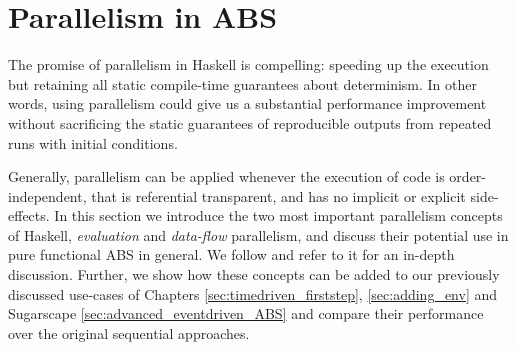 \chapter{Parallelism in ABS}
\label{ch:parallelism_ABS}

The promise of parallelism in Haskell is compelling: speeding up the execution but retaining all static compile-time guarantees about determinism. In other words, using parallelism could give us a substantial performance improvement without sacrificing the static guarantees of reproducible outputs from repeated runs with initial conditions.

Generally, parallelism can be applied whenever the execution of code is order-independent, that is referential transparent, and has no implicit or explicit side-effects. In this section we introduce the two most important parallelism concepts of Haskell, \textit{evaluation} and \textit{data-flow} parallelism, and discuss their potential use in pure functional ABS in general. We follow \cite{marlow_parallel_2013} and refer to it for an in-depth discussion. Further, we show how these concepts can be added to our previously discussed use-cases of Chapters \ref{sec:timedriven_firststep}, \ref{sec:adding_env} and Sugarscape \ref{sec:advanced_eventdriven_ABS} and compare their performance over the original sequential approaches.





%
%




